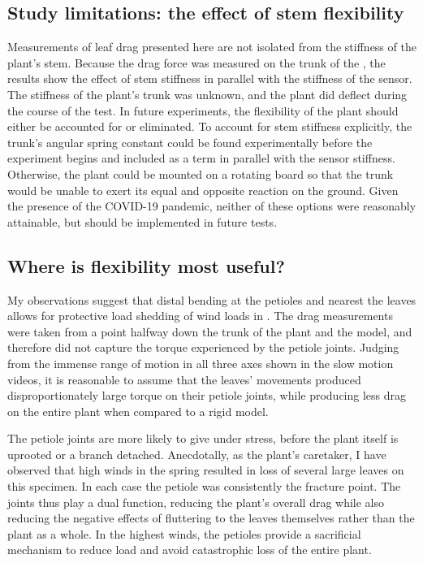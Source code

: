 \subsection{Study limitations: the effect of stem flexibility}
Measurements of leaf drag presented here are not isolated from the stiffness of the plant's stem.  Because the drag force was measured on the trunk of the \Cxparadisi, the results show the effect of stem stiffness in parallel with the stiffness of the sensor.  The stiffness of the plant's trunk was unknown, and the plant did deflect during the course of the test. In future experiments, the flexibility of the plant should either be accounted for or eliminated. To account for stem stiffness explicitly, the trunk's angular spring constant could be found experimentally before the experiment begins and included as a term in parallel with the sensor stiffness. Otherwise, the plant could be mounted on a rotating board so that the trunk would be unable to exert its equal and opposite reaction on the ground. Given the presence of the COVID-19 pandemic, neither of these options were reasonably attainable, but should be implemented in future tests.

\subsection{Where is flexibility most useful?}
My observations suggest that distal bending at the petioles and nearest the leaves allows for protective load shedding of wind loads in \Cxparadisi. The drag measurements were taken from a point halfway down the trunk of the plant and the model, and therefore did not capture the torque experienced by the petiole joints. Judging from the immense range of motion in all three axes shown in the slow motion videos, it is reasonable to assume that the leaves' movements produced disproportionately large torque on their petiole joints, while producing less drag on the entire plant when compared to a rigid model. 

The petiole joints are more likely to give under stress, before the plant itself is uprooted or a branch detached. Anecdotally, as the plant's caretaker, I have observed that high winds in the spring resulted in loss of several large leaves on this specimen. In each case the petiole was consistently the fracture point. The joints thus play a dual function, reducing the plant's overall drag while also reducing the negative effects of fluttering to the leaves themselves rather than the plant as a whole. In the highest winds, the petioles provide a sacrificial mechanism to reduce load and avoid catastrophic loss of the entire plant. 

